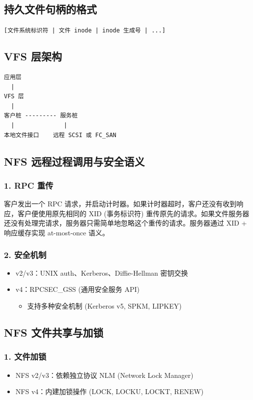 \subsection{持久文件句柄的格式}
\texttt{[文件系统标识符 | 文件 inode | inode 生成号 | ...]}

\subsection{VFS 层架构}
\begin{verbatim}
应用层
  |
VFS 层
  |
客户桩 --------- 服务桩
  |              |
本地文件接口    远程 SCSI 或 FC_SAN
\end{verbatim}

\subsection{NFS 远程过程调用与安全语义}

\subsubsection{1. RPC 重传}
客户发出一个 RPC 请求，并启动计时器。如果计时器超时，客户还没有收到响应，客户便使用原先相同的 XID (事务标识符) 重传原先的请求。如果文件服务器还没有处理完请求，服务器只需简单地忽略这个重传的请求。服务器通过 XID + 响应缓存实现 at-most-once 语义。

\subsubsection{2. 安全机制}
\begin{itemize}
    \item v2/v3：UNIX auth、Kerberos、Diffie-Hellman 密钥交换
    \item v4：RPCSEC\_GSS (通用安全服务 API)
    \begin{itemize}
        \item 支持多种安全机制 (Kerberos v5, SPKM, LIPKEY)
    \end{itemize}
\end{itemize}

\subsection{NFS 文件共享与加锁}

\subsubsection{1. 文件加锁}
\begin{itemize}
    \item NFS v2/v3：依赖独立协议 NLM (Network Lock Manager)
    \item NFS v4：内建加锁操作 (LOCK, LOCKU, LOCKT, RENEW)
\end{itemize}

